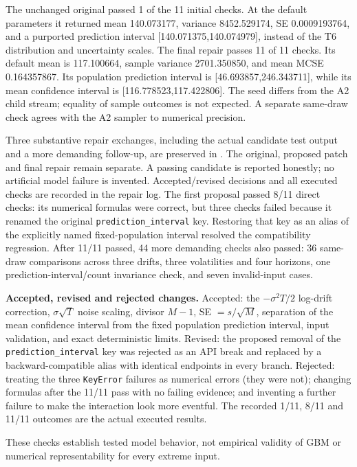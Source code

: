 The unchanged original passed 1 of the 11 initial checks. At the default parameters it returned mean 140.073177, variance 8452.529174, SE 0.0009193764, and a purported prediction interval [140.071375,140.074979], instead of the T6 distribution and uncertainty scales.
The final repair passes 11 of 11 checks. Its default mean is 117.100664, sample variance 2701.350850, and mean MCSE 0.164357867. Its population prediction interval is [46.693857,246.343711], while its mean confidence interval is [116.778523,117.422806]. The seed differs from the A2 child stream; equality of sample outcomes is not expected. A separate same-draw check agrees with the A2 sampler to numerical precision.

Three substantive repair exchanges, including the actual candidate test output and a more demanding follow-up, are preserved in . The original, proposed patch and final repair remain separate. A passing candidate is reported honestly; no artificial model failure is invented. Accepted/revised decisions and all executed checks are recorded in the repair log.
The first proposal passed 8/11 direct checks: its numerical formulas were correct, but three checks failed because it renamed the original \texttt{prediction\_interval} key. Restoring that key as an alias of the explicitly named fixed-population interval resolved the compatibility regression. After 11/11 passed, 44 more demanding checks also passed: 36 same-draw comparisons across three drifts, three volatilities and four horizons, one prediction-interval/count invariance check, and seven invalid-input cases.

\textbf{Accepted, revised and rejected changes.} Accepted: the $-\sigma^2T/2$ log-drift correction, $\sigma\sqrt T$ noise scaling, divisor $M-1$, SE $=s/\sqrt M$, separation of the mean confidence interval from the fixed population prediction interval, input validation, and exact deterministic limits. Revised: the proposed removal of the \texttt{prediction\_interval} key was rejected as an API break and replaced by a backward-compatible alias with identical endpoints in every branch. Rejected: treating the three \texttt{KeyError} failures as numerical errors (they were not); changing formulas after the 11/11 pass with no failing evidence; and inventing a further failure to make the interaction look more eventful. The recorded 1/11, 8/11 and 11/11 outcomes are the actual executed results.

These checks establish tested model behavior, not empirical validity of GBM or numerical representability for every extreme input.
